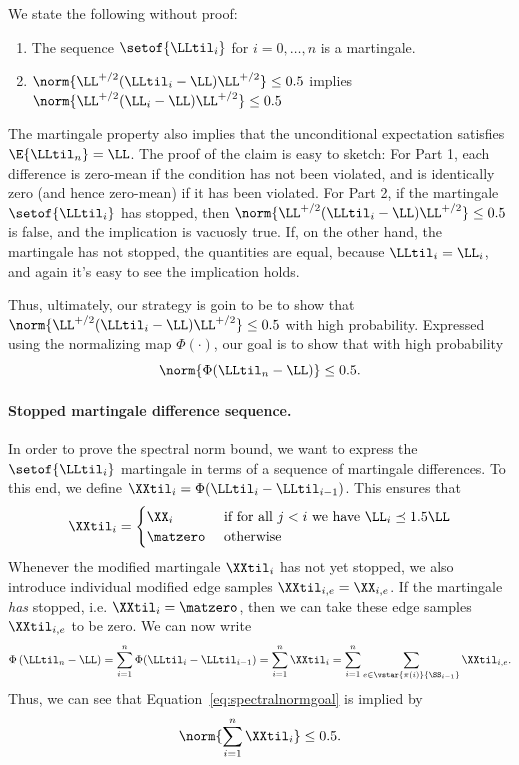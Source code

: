 We state the following without proof:
\begin{claim}
\noindent
  \begin{enumerate}
  \item The sequence $\setof{\LLtil_i}$ for $i = 0, \ldots, n$ is a
    martingale.
  \item $\norm{\LL^{+/2} (\LLtil_i -  \LL) \LL^{+/2}} \leq 0.5$
    implies $\norm{\LL^{+/2} (\LL_i -  \LL) \LL^{+/2}} \leq 0.5$
  \end{enumerate}
\end{claim}
The martingale property also implies that the unconditional
expectation satisfies $\E{\LLtil_n} = \LL$.
The proof of the claim is easy to sketch: For Part 1, each difference is
zero-mean if the condition has not been violated, and is identically
zero (and hence zero-mean) if it has been violated.
For Part 2, if the martingale $\setof{\LLtil_i}$ has stopped,
then $\norm{\LL^{+/2}
  (\LLtil_i -  \LL) \LL^{+/2}} \leq 0.5$ is false, and the implication
is vacuosly true.
If, on the other hand, the martingale has not stopped, the
quantities are equal, because $\LLtil_i  = \LL_i$, and again it's easy
to see the implication holds.

Thus, ultimately, our strategy is goin to be to show that
$\norm{\LL^{+/2} (\LLtil_i -  \LL) \LL^{+/2}} \leq 0.5$
with high probability.
Expressed using the normalizing map $\Phi(\cdot)$,
our goal is to show that with high probability
\[
  \norm{\Phi(\LLtil_n -  \LL)} \leq 0.5.
\]

\paragraph{Stopped martingale difference sequence.}
In order to prove the spectral norm bound, we want to express the
$\setof{\LLtil_i}$ martingale in terms of a sequence of martingale
differences.
To this end, we define
$\XXtil_i = \Phi(\LLtil_i -  \LLtil_{i-1})$.
This ensures that
\begin{equation}
  \label{eq:stoppedmartingale2}
  \XXtil_i
  =
  \begin{cases}
    \XX_i& \text{ if for all } j < i \text{ we have }
       \LL_i \preceq 1.5 \LL
       \\
    \matzero & \text{ otherwise }
  \end{cases}
\end{equation}
Whenever the modified martingale $\XXtil_i$ has not yet stopped, we
also introduce individual modified edge samples $\XXtil_{i,e} =
\XX_{i,e}$.
If the martingale \emph{has} stopped, i.e. $\XXtil_i = \matzero$,
then we can take these edge samples $\XXtil_{i,e}$
to be zero.
We can now write
\[
  \Phi\left(  \LLtil_n -\LL \right)
  =
    \sum_{i=1}^n \Phi(\LLtil_i - \LLtil_{i-1})
  =
  \sum_{i=1}^n \XXtil_i
  =
  \sum_{i=1}^n \sum_{e \in
    \vstar{\pi(i)}{\SS_{i-1}}}\XXtil_{i,e}
  .
\]
Thus, we can see that Equation~\eqref{eq:spectralnormgoal} is implied by
\begin{equation}
  \label{eq:zeromeanspectralnormgoal}
  \norm{\sum_{i=1}^n \XXtil_i} \leq 0.5.
\end{equation}

